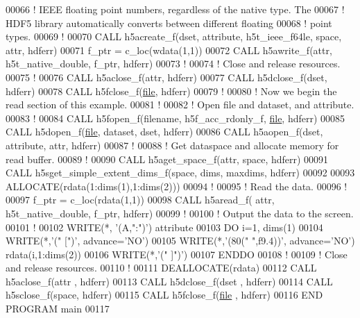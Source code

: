 \begin{DoxyCode}
00066   \textcolor{comment}{! IEEE floating point numbers, regardless of the native type.  The}
00067   \textcolor{comment}{! HDF5 library automatically converts between different floating}
00068   \textcolor{comment}{! point types.}
00069   \textcolor{comment}{!}
00070   \textcolor{keyword}{CALL }h5acreate\_f(dset, attribute, h5t\_ieee\_f64le, space, attr, hdferr)
00071   f\_ptr = c\_loc(wdata(1,1))
00072   \textcolor{keyword}{CALL }h5awrite\_f(attr, h5t\_native\_double, f\_ptr, hdferr)
00073   \textcolor{comment}{!}
00074   \textcolor{comment}{! Close and release resources.}
00075   \textcolor{comment}{!}
00076   \textcolor{keyword}{CALL }h5aclose\_f(attr, hdferr)
00077   \textcolor{keyword}{CALL }h5dclose\_f(dset, hdferr)
00078   \textcolor{keyword}{CALL }h5fclose\_f(\hyperlink{structfile}{file}, hdferr)
00079   \textcolor{comment}{!}
00080   \textcolor{comment}{! Now we begin the read section of this example.}
00081   \textcolor{comment}{!}
00082   \textcolor{comment}{! Open file and dataset, and attribute.}
00083   \textcolor{comment}{!}
00084   \textcolor{keyword}{CALL }h5fopen\_f(filename, h5f\_acc\_rdonly\_f, \hyperlink{structfile}{file}, hdferr)
00085   \textcolor{keyword}{CALL }h5dopen\_f(\hyperlink{structfile}{file}, dataset, dset, hdferr)
00086   \textcolor{keyword}{CALL }h5aopen\_f(dset, attribute, attr, hdferr)
00087   \textcolor{comment}{!}
00088   \textcolor{comment}{! Get dataspace and allocate memory for read buffer.}
00089   \textcolor{comment}{!}
00090   \textcolor{keyword}{CALL }h5aget\_space\_f(attr, space, hdferr)
00091   \textcolor{keyword}{CALL }h5sget\_simple\_extent\_dims\_f(space, dims, maxdims, hdferr)
00092 
00093   \textcolor{keyword}{ALLOCATE}(rdata(1:dims(1),1:dims(2)))
00094   \textcolor{comment}{!}
00095   \textcolor{comment}{! Read the data.}
00096   \textcolor{comment}{!}
00097   f\_ptr = c\_loc(rdata(1,1))
00098   \textcolor{keyword}{CALL }h5aread\_f( attr, h5t\_native\_double, f\_ptr, hdferr)
00099   \textcolor{comment}{!}
00100   \textcolor{comment}{! Output the data to the screen.}
00101   \textcolor{comment}{!}
00102   \textcolor{keyword}{WRITE}(*, \textcolor{stringliteral}{'(A,":")'}) attribute
00103   \textcolor{keywordflow}{DO} i=1, dims(1)
00104      \textcolor{keyword}{WRITE}(*,\textcolor{stringliteral}{'(" [")'}, advance=\textcolor{stringliteral}{'NO'})
00105      \textcolor{keyword}{WRITE}(*,\textcolor{stringliteral}{'(80(" ",f9.4))'}, advance=\textcolor{stringliteral}{'NO'}) rdata(i,1:dims(2))
00106      \textcolor{keyword}{WRITE}(*,\textcolor{stringliteral}{'(" ]")'})
00107 \textcolor{keywordflow}{  ENDDO}
00108   \textcolor{comment}{!}
00109   \textcolor{comment}{! Close and release resources.}
00110   \textcolor{comment}{!}
00111   \textcolor{keyword}{DEALLOCATE}(rdata)
00112   \textcolor{keyword}{CALL }h5aclose\_f(attr , hdferr)
00113   \textcolor{keyword}{CALL }h5dclose\_f(dset , hdferr)
00114   \textcolor{keyword}{CALL }h5sclose\_f(space, hdferr)
00115   \textcolor{keyword}{CALL }h5fclose\_f(\hyperlink{structfile}{file} , hdferr)
00116 \textcolor{keyword}{END PROGRAM }main
00117 
\end{DoxyCode}
